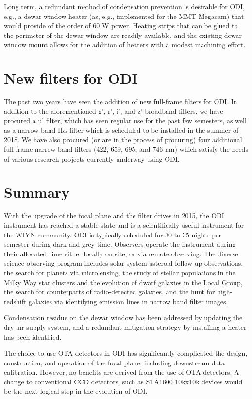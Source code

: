 \documentclass[]{spieman}
\begin{document}
Long term, a redundant method of condensation prevention is desirable for
ODI, e.g., a dewar window heater (as, e.g., implemented for the MMT 
Megacam\cite{McLeod2015}) that would provide of the
order of 60 W power. Heating strips that can be glued to the perimeter of the
dewar window are readily available, and the existing dewar window mount allows
for the addition of heaters with a modest machining effort.

\section{New filters for ODI}

The past two years have seen the addition of new full-frame filters for ODI.  In
addition to the aforementioned g', r', i', and z' broadband filters, we have
procured a u' filter, which has seen regular use for the past few semesters, as
well as a narrow band H$\alpha$ filter which is scheduled to be installed in the
summer of 2018. We have also procured (or are in the process of procuring) four
additional full-frame narrow band filters (422, 659, 695, and 746 nm) which
satisfy the needs of various research projects currently underway using ODI.

\section{Summary}

With the upgrade of the focal plane and the filter drives in 2015, the ODI
instrument has reached a stable state and is a scientifically useful instrument
for the WIYN community\cite{janesh2015, adams2015a, adams2015b, cannon2015, davis2015,
janowiecki2015, janowiecki2015PhDT, janesch2017, jewtitt2017, leisman2017, rhode2017, 
lee 2018a, lee2018b, lee2018c,   gorsuch2018 }. ODI is typically scheduled for 30 to 35 nights per
semester during dark and grey time. Observers operate the instrument during
their allocated time either locally on site, or via remote observing. The
diverse science observing program includes solar system asteroid follow up
observations, the search for planets via microlensing, the study of stellar
populations in the  Milky Way star clusters and the evolution of dwarf galaxies
in the Local Group, the search for  counterparts of radio-detected galaxies, and
the hunt for high-redshift galaxies via identifying emission lines in narrow
band filter images.

Condensation residue on the dewar window has been addressed by updating the dry
air supply system, and a redundant  mitigation strategy by installing a heater
has been identified.

The choice to use  OTA detectors in ODI has significantly complicated the
design, construction, and operation of the focal plane, including downstream
data calibration. However, no benefits are derived from the use of OTA
detectors.  A change to conventional CCD detectors, such as STA1600 10kx10k
devices would be the next logical step in the evolution of ODI.



 

\end{document}
